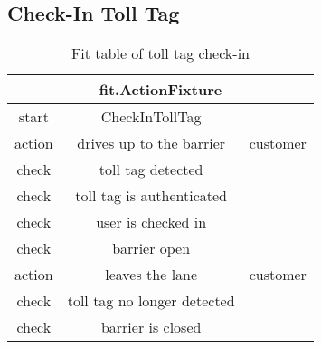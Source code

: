 \subsection{Check-In Toll Tag}
\begin{table}
\begin{centering}
\begin{tabular}{|c|c|c||c||c||c||c||c||c||c||c||c||c||c|}
\hline 
\multicolumn{14}{|c}{fit.ActionFixture}\tabularnewline
\hline 
start & CheckInTollTag & \multicolumn{12}{c|}{}\tabularnewline
\hline 
action & drives up to the barrier & \multicolumn{12}{c|}{customer}\tabularnewline
\hline 
check & toll tag detected & \multicolumn{12}{c|}{}\tabularnewline
\hline 
check & toll tag is authenticated & \multicolumn{12}{c|}{}\tabularnewline
\hline 
check & user is checked in & \multicolumn{12}{c|}{}\tabularnewline
\hline 
check & barrier open & \multicolumn{12}{c|}{}\tabularnewline
\hline 
action & leaves the lane & \multicolumn{12}{c|}{customer}\tabularnewline
\hline 
check & toll tag no longer detected & \multicolumn{12}{c|}{}\tabularnewline
\hline 
check & barrier is closed & \multicolumn{12}{c|}{}\tabularnewline
\hline 
\end{tabular}
\par\end{centering}

\caption{Fit table of toll tag check-in}
\end{table}

